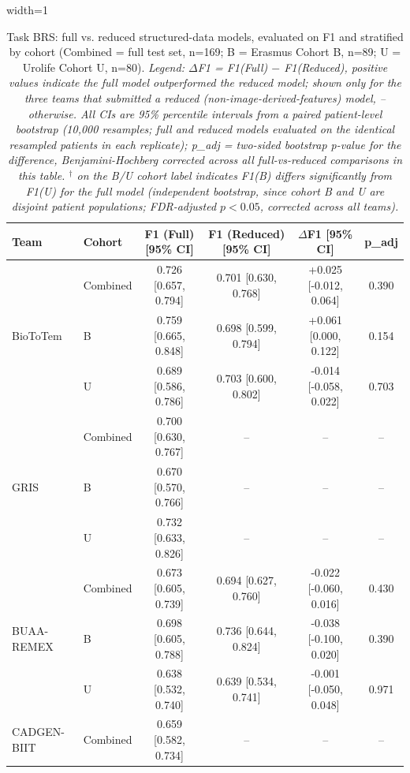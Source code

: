 \begin{table}[H]
  \centering
  \caption{Task BRS: full vs. reduced structured-data models, evaluated on F1 and stratified by cohort (Combined = full test set, n=169; B = Erasmus Cohort B, n=89; U = Urolife Cohort U, n=80). \textit{Legend: $\Delta$F1 = F1(Full) $-$ F1(Reduced), positive values indicate the full model outperformed the reduced model; shown only for the three teams that submitted a reduced (non-image-derived-features) model, -- otherwise. All CIs are 95\% percentile intervals from a paired patient-level bootstrap (10,000 resamples; full and reduced models evaluated on the identical resampled patients in each replicate); p\_adj = two-sided bootstrap p-value for the difference, Benjamini-Hochberg corrected across all full-vs-reduced comparisons in this table. $^{\dagger}$ on the B/U cohort label indicates F1(B) differs significantly from F1(U) for the full model (independent bootstrap, since cohort B and U are disjoint patient populations; FDR-adjusted $p<0.05$, corrected across all teams).}}
  \begin{adjustbox}{width=1\textwidth}
  \begin{tabular}{llcccc}
  \textbf{Team} & \textbf{Cohort} & \textbf{F1 (Full) [95\% CI]} & \textbf{F1 (Reduced) [95\% CI]} & \textbf{$\Delta$F1 [95\% CI]} & \textbf{p\_adj} \\
  \hline
  \multirow{3}{*}{BioToTem} & Combined & 0.726 [0.657, 0.794] & 0.701 [0.630, 0.768] & +0.025 [-0.012, 0.064] & 0.390 \\
   & B & 0.759 [0.665, 0.848] & 0.698 [0.599, 0.794] & +0.061 [0.000, 0.122] & 0.154 \\
   & U & 0.689 [0.586, 0.786] & 0.703 [0.600, 0.802] & -0.014 [-0.058, 0.022] & 0.703 \\
  \hline
  \multirow{3}{*}{GRIS} & Combined & 0.700 [0.630, 0.767] & -- & -- & -- \\
   & B & 0.670 [0.570, 0.766] & -- & -- & -- \\
   & U & 0.732 [0.633, 0.826] & -- & -- & -- \\
  \hline
  \multirow{3}{*}{BUAA-REMEX} & Combined & 0.673 [0.605, 0.739] & 0.694 [0.627, 0.760] & -0.022 [-0.060, 0.016] & 0.430 \\
   & B & 0.698 [0.605, 0.788] & 0.736 [0.644, 0.824] & -0.038 [-0.100, 0.020] & 0.390 \\
   & U & 0.638 [0.532, 0.740] & 0.639 [0.534, 0.741] & -0.001 [-0.050, 0.048] & 0.971 \\
  \hline
  \multirow{3}{*}{CADGEN-BIIT} & Combined & 0.659 [0.582, 0.734] & -- & -- & -- \\

\end{tabular}
\end{adjustbox}
\end{table}
